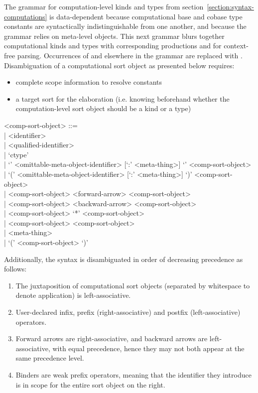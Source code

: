 \documentclass[11pt]{article}
\begin{document}
The grammar for computation-level kinds and types from section~\ref{section:syntax-computations} is data-dependent because computational base and cobase type constants are syntactically indistinguishable from one another, and because the grammar relies on meta-level objects.
This next grammar blurs together computational kinds and types with corresponding productions  and  for context-free parsing.
Occurrences of  and  elsewhere in the grammar are replaced with .
Disambiguation of a computational sort object as presented below requires:
\begin{itemize}
\item complete scope information to resolve constants
\item a target sort for the elaboration (i.e. knowing beforehand whether the computation-level sort object should be a kind or a type)
\end{itemize}

\begin{grammar}
<comp-sort-object> ::= \hfill\\
| <identifier>\\
| <qualified-identifier>\\
| `ctype'\\
| `{' <omittable-meta-object-identifier> [`:' <meta-thing>] `}' <comp-sort-object>\\
| `(' <omittable-meta-object-identifier> [`:' <meta-thing>] `)' <comp-sort-object>\\
| <comp-sort-object> <forward-arrow> <comp-sort-object>\\
| <comp-sort-object> <backward-arrow> <comp-sort-object>\\
| <comp-sort-object> `*' <comp-sort-object>\\
| <comp-sort-object> <comp-sort-object>\\
| <meta-thing>\\
| `(' <comp-sort-object> `)'
\end{grammar}

Additionally, the syntax is disambiguated in order of decreasing precedence as follows:

\begin{enumerate}
\item The juxtaposition of computational sort objects (separated by whitespace to denote application) is left-associative.
\item User-declared infix, prefix (right-associative) and postfix (left-associative) operators.
\item Forward arrows are right-associative, and backward arrows are left-associative, with equal precedence, hence they may not both appear at the same precedence level.
\item Binders are weak prefix operators, meaning that the identifier they introduce is in scope for the entire sort object on the right.
\end{enumerate}
\end{document}
